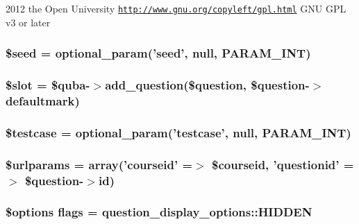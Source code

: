 2012 the Open University  \href{http://www.gnu.org/copyleft/gpl.html}{\tt http://www.gnu.org/copyleft/gpl.html} GNU GPL v3 or later \hypertarget{questiontestedit_8php_a4aea6700edf05cf13c65dc0e758c9ad3}{
\subsubsection[{\$seed}]{\setlength{\rightskip}{0pt plus 5cm}\$seed = optional\_\-param('seed', null, PARAM\_\-INT)}}
\label{questiontestedit_8php_a4aea6700edf05cf13c65dc0e758c9ad3}
\hypertarget{questiontestedit_8php_a3e6bbab99eb17efe8681b9072bf74a2d}{
\subsubsection[{\$slot}]{\setlength{\rightskip}{0pt plus 5cm}\$slot = \$quba-\/$>$add\_\-question(\$question, \$question-\/$>$defaultmark)}}
\label{questiontestedit_8php_a3e6bbab99eb17efe8681b9072bf74a2d}
\hypertarget{questiontestedit_8php_ae640ef9490b2598569406e3654f480b6}{
\subsubsection[{\$testcase}]{\setlength{\rightskip}{0pt plus 5cm}\$testcase = optional\_\-param('testcase', null, PARAM\_\-INT)}}
\label{questiontestedit_8php_ae640ef9490b2598569406e3654f480b6}
\hypertarget{questiontestedit_8php_a1aa950c4029aca228dd33a4b27109e00}{
\subsubsection[{\$urlparams}]{\setlength{\rightskip}{0pt plus 5cm}\$urlparams = array('courseid' =$>$ \$courseid, 'questionid' =$>$ \$question-\/$>$id)}}
\label{questiontestedit_8php_a1aa950c4029aca228dd33a4b27109e00}
\hypertarget{questiontestedit_8php_adcb2a3f70c8c91986e6561111d0d9b0f}{
\subsubsection[{flags}]{\setlength{\rightskip}{0pt plus 5cm}\$options {\bf flags} = question\_\-display\_\-options::HIDDEN}}
